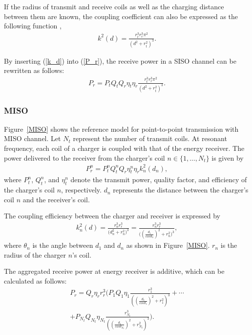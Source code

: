 \documentclass[twocolumn,10pt]{IEEEtran}
\begin{document}
 
If the radius of transmit and receive coils as well as the charging distance between them are known, the coupling coefficient can also be expressed as the following function \cite{I.2011Agbinya,I.2013Agbinya}, 
\begin{eqnarray}\label{k_d}
k^{2}(d)=\frac{r^{3}_{t}r^{3}_{r}\pi^{2}}{(d^2+r^{2}_{t})^3}.
\end{eqnarray}

By inserting (\ref{k_d}) into (\ref{P_r}), the receive power in a SISO channel can be rewritten as follows:
\begin{eqnarray} \label{P_r2}
P_{r}=P_{t}Q_{t}Q_{r}\eta_{t}\eta_{r} \frac{r^{3}_{t}r^{3}_{r}\pi^{2}}{(d^2+r^{2}_{t})^3}.
\end{eqnarray}


 
\subsubsection{MISO}


Figure~\ref{MISO} shows the reference model for point-to-point transmission with MISO channel. 
Let $N_{t}$ represent the number of transmit coils. At resonant frequency, each coil of a charger is coupled with that of the energy receiver. The power delivered to the receiver from the charger's coil $n \in \{1,\ldots,N_{t}\}$ is given by~\cite{H.2013Nguyen}
\begin{eqnarray}
P^{n}_{r} = P^{n}_{t} Q^{n}_{t} Q_{r} \eta^{n}_{t} \eta_{r} k^{2}_{n}(d_{n})	,
\end{eqnarray}
where $P^{n}_{t}$, $Q^{n}_{t}$, and $\eta^{n}_{t}$ denote the transmit power, quality factor, and efficiency of the charger's coil $n$, respectively. $d_{n}$ represents the distance between the charger's coil $n$ and the receiver's coil.
  
  
The coupling efficiency between the charger and receiver is expressed by~\cite{H.2013Nguyen}
\begin{eqnarray}\label{coefficiency}
k^{2}_{n}(d)= \frac{r^{3}_{n}r^{3}_{r}}{\big ( d^{2}_{n} +r^{2}_{n}\big)^{3}} = \frac{r^{3}_{n}r^{3}_{r}}{\big ( (\frac{d_{1}}{cos \theta_{n}}  )^{2}+r^{2}_{n}\big)^{3}}	,
\end{eqnarray}
where $\theta_{n}$ is the angle between $d_{1}$ and $d_{n}$ as shown in Figure~\ref{MISO}. $r_{n}$ is the radius of the charger $n$'s coil. 

The aggregated receive power at energy receiver is additive, which can be calculated as follows: 
\begin{eqnarray}
P_{r}= Q_{r}\eta_{r}r^{3}_{r} \Bigg(P_{1}Q_{1}\eta_{1}\frac{r^{3}_{1}}{\left ((\frac{d_{1}}{cos\theta_{1}})^{2} + r^{2}_{1} \right)^{3}} +	\cdots \nonumber  \\ 
+ P_{N_{t}}Q_{N_{t}}\eta_{N_{t}} \frac{r^{3}_{N_{t}}}{\left ((\frac{d_{1}}{cos\theta_{N_{t}}})^{2} + r^{2}_{N_{t}} \right)^{3}}   \Bigg)	.
\end{eqnarray}
\end{document}

